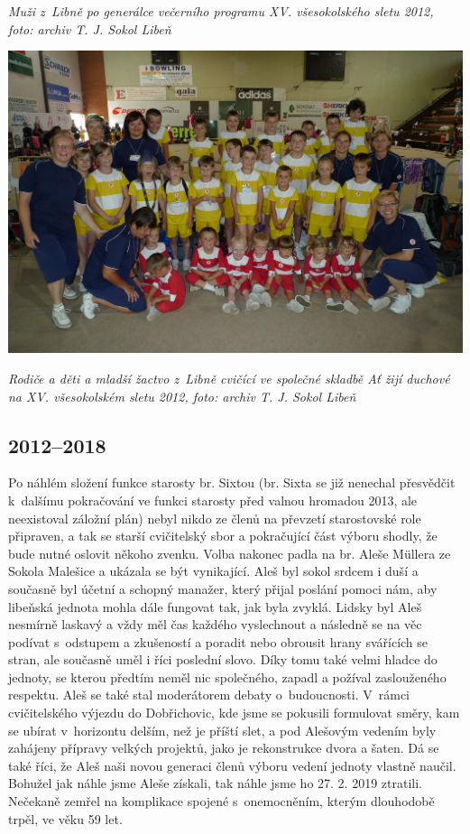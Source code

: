 \documentclass[a5paper, 11pt, twoside]{article}
\begin{document}
\textit{Muži z~Libně po generálce večerního programu XV. všesokolského
sletu 2012, foto: archiv T. J. Sokol Libeň}

 \includegraphics[width=\textwidth]{img/62_rd_duchove.JPG}

\textit{Rodiče a děti a mladší žactvo z~Libně cvičící ve společné skladbě
Ať žijí duchové na XV. všesokolském sletu 2012, foto: archiv T. J. Sokol Libeň}

\subsection{2012--2018}

Po náhlém složení funkce starosty br. Sixtou (br. Sixta se již nenechal
přesvědčit k~dalšímu pokračování ve funkci starosty před valnou hromadou
2013, ale neexistoval záložní plán) nebyl nikdo ze členů na převzetí
starostovské role připraven, a tak se starší cvičitelský sbor a
pokračující část výboru shodly, že bude nutné oslovit někoho zvenku.
Volba nakonec padla na br. Aleše Müllera ze Sokola Malešice a ukázala se
být vynikající. Aleš byl sokol srdcem i duší a současně byl účetní a
schopný manažer, který přijal poslání pomoci nám, aby libeňská jednota
mohla dále fungovat tak, jak byla zvyklá. Lidsky byl Aleš nesmírně
laskavý a vždy měl čas každého vyslechnout a následně se na věc podívat
s~odstupem a zkušeností a poradit nebo obrousit hrany svářících se
stran, ale současně uměl i říci poslední slovo. Díky tomu také velmi
hladce do jednoty, se kterou předtím neměl nic společného, zapadl a
požíval zaslouženého respektu. Aleš se také stal moderátorem debaty
o~budoucnosti. V~rámci cvičitelského výjezdu do Dobřichovic, kde jsme se
pokusili formulovat směry, kam se ubírat v~horizontu delším, než je
příští slet, a pod Alešovým vedením byly zahájeny přípravy velkých
projektů, jako je rekonstrukce dvora a šaten. Dá se také říci, že Aleš
naši novou generaci členů výboru vedení jednoty vlastně naučil. Bohužel
jak náhle jsme Aleše získali, tak náhle jsme ho 27. 2. 2019 ztratili.
Nečekaně zemřel na komplikace spojené s~onemocněním, kterým dlouhodobě
trpěl, ve věku 59 let.
\end{document}
